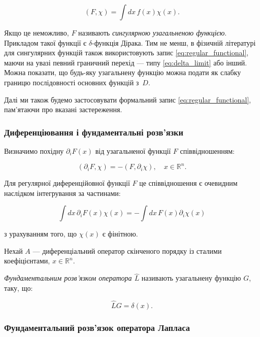 \begin{equation}
(F, \chi) = \int dx \, f(x) \chi(x).
\label{eq:regular_functional}
\end{equation}

Якщо це неможливо, \( F \) називають \textit{сингулярною узагальненою функцією}. Прикладом такої функції є \(\delta\)-функція Дірака. Тим не менш, в
фізичній літературі для сингулярних функцій також використовують запис \eqref{eq:regular_functional}, маючи на увазі певний граничний перехід --- типу
\eqref{eq:delta_limit} або інший. Можна показати, що будь-яку узагальнену функцію можна подати як слабку границю послідовності основних функцій з~\( D
\).

Далі ми також будемо застосовувати формальний запис \eqref{eq:regular_functional}, пам’ятаючи про вказані застереження.

\subsubsection{Диференціювання і фундаментальні розв’язки}

Визначимо похідну \( \partial_i F(x) \) від узагальненої функції \( F \) співвідношенням:

\begin{equation}
(\partial_i F, \chi) = - (F, \partial_i \chi), \quad x \in \mathbb{R}^n.
\label{eq:derivative_definition}
\end{equation}

Для регулярної диференційовної функції \( F \) це співвідношення є очевидним наслідком інтегрування за частинами:

\begin{equation*}
\int dx \, \partial_i F(x) \chi(x) = - \int dx \, F(x) \partial_i \chi(x)
\end{equation*}

з урахуванням того, що \( \chi(x) \) є фінітною.

Нехай \( A \) --- диференціальний оператор скінченого порядку із сталими коефіцієнтами, \( x \in \mathbb{R}^n \).

\emph{Фундаментальним розв’язком оператора \( \hat{L} \)} називають узагальнену функцію \( G \), таку, що:

\begin{equation}
\hat{L} G = \delta(x).
\label{eq:fundamental_solution}
\end{equation}


\subsubsection{Фундаментальний розв’язок оператора Лапласа}

